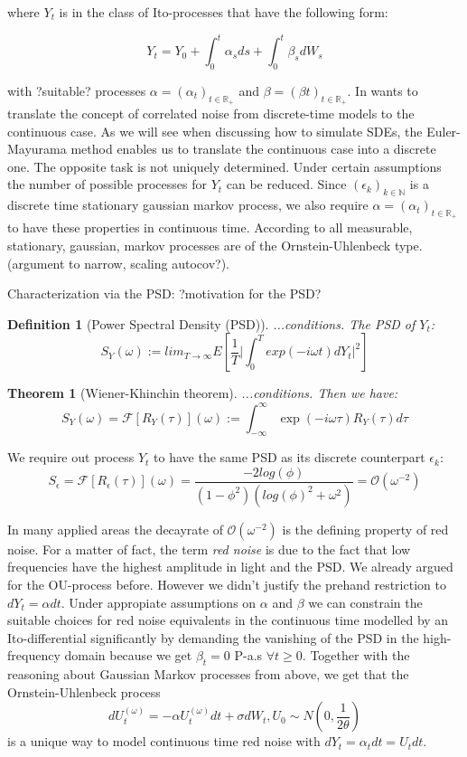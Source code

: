 \documentclass[%
thesis=student,%
coverpage=false,%
titlepage=false,%
headmarks=true, %
german,%
font=libertine, %
math=newpxtx, %
BCOR=5mm,%
coverBCOR=11mm%
]{tumbook}
\newtheorem{definition}{Definition}[section]
\newtheorem{theorem}{Theorem}
\begin{document}
where $Y_{t}$ is in the class of Ito-processes that have the following form:

\[
Y_{t} = Y_{0} + \int_{0}^{t}\alpha_{s}ds + \int_{0}^{t}\beta_{s}dW_{s}
\]

with ?suitable? processes $\alpha = (\alpha_{t})_{t\in\mathbb{R}_{+}}$ and $\beta = (\beta{t})_{t\in\mathbb{R}_{+}}$.
In \cite{Morr:2022} wants to translate the concept of correlated noise from discrete-time models to the continuous case. As we will see when discussing how to simulate SDEs, the Euler-Mayurama method enables us to translate the continuous case into a discrete one. The opposite task is not uniquely determined. Under certain assumptions the number of possible processes for $Y_{t}$ can be reduced. Since $(\epsilon_{k})_{k\in\mathbb{N}}$ is a discrete time stationary gaussian markov process, we also require $\alpha = (\alpha_{t})_{t\in\mathbb{R}_{+}}$ to have these properties in continuous time. According to \cite{doob:1942} all measurable, stationary, gaussian, markov processes are of the Ornstein-Uhlenbeck type. (argument to narrow, scaling autocov?).

Characterization via the PSD:
?motivation for the PSD?

\begin{definition}[Power Spectral Density (PSD)]
...conditions. The PSD of $Y_{t}$:
\[
S_{Y}(\omega) := lim_{T\rightarrow\infty}E[\frac{1}{T}\lvert\int_{0}^{T}exp(-i\omega t)dY_{t}\rvert^{2}]
\]
\end{definition}

\begin{theorem}[Wiener-Khinchin theorem]
...conditions. Then we have:
\[
S_{Y}(\omega) = \mathcal{F}[R_{Y}(\tau)](\omega) := \int_{-\infty}^{\infty}\exp(-i\omega\tau)R_{Y}(\tau)d\tau
\]
\end{theorem}

We require out process $Y_{t}$ to have the same PSD as its discrete counterpart $\epsilon_{k}$:
\[
S_{\epsilon} = \mathcal{F}[R_{\epsilon}(\tau)](\omega) = \frac{-2log(\phi)}{(1-\phi^{2})(log(\phi)^{2}+\omega^{2})} = \mathcal{O}(\omega^{-2})
\]

In many applied areas the decayrate of $\mathcal{O}(\omega^{-2})$ is the defining property of red noise. For a matter of fact, the term \textit{red noise} is due to the fact that low frequencies have the highest amplitude in light and the PSD. We already argued for the OU-process before. However we didn't justify the prehand restriction to $dY_{t} = \alpha dt$. Under appropiate assumptions on $\alpha$ and $\beta$ we can constrain the suitable choices for red noise equivalents in the continuous time modelled by an Ito-differential significantly by demanding the vanishing of the PSD in the high-frequency domain because we get $\beta_{t} = 0$ P-a.s $\forall t \geq 0$. Together with the reasoning about Gaussian Markov processes from above, we get that the Ornstein-Uhlenbeck process
\[
    dU_{t}^{(\omega)} = -\alpha U_{t}^{(\omega)} dt + \sigma dW_{t}, U_{0} \sim N(0,\frac{1}{2\theta})
\]
is a unique way to model continuous time red noise with $dY_{t} = \alpha_{t}dt = U_{t}dt$. 
\end{document}
